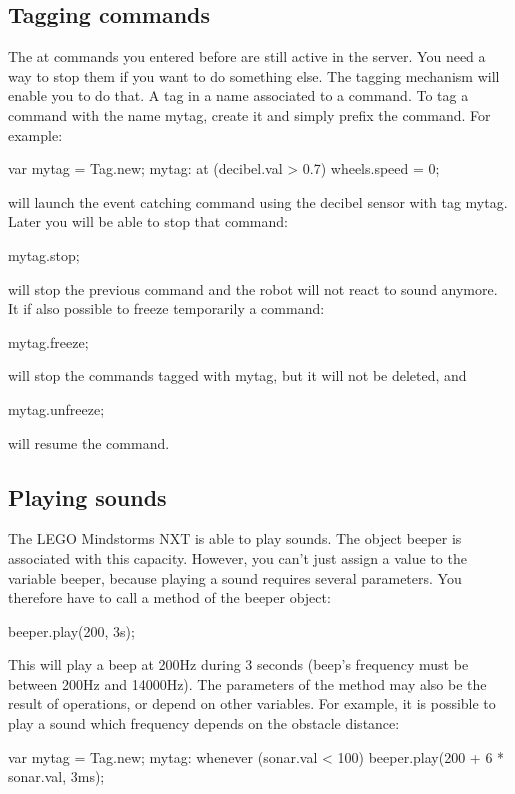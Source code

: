 \subsection{Tagging commands}
The at commands you entered before are still active in the server. You need a
way to stop them if you want to do something else. The tagging mechanism will
enable you to do that.
A tag in a name associated to a command. To tag a command with the name mytag,
create it and simply prefix the command. For example:
\begin{urbiunchecked}
var mytag = Tag.new;
mytag: at (decibel.val > 0.7)
  wheels.speed = 0;
\end{urbiunchecked}

will launch the event catching command using the decibel sensor with tag mytag.
Later you will be able to stop that command:
\begin{urbiunchecked}
mytag.stop;
\end{urbiunchecked}

will stop the previous command and the robot will not react to sound anymore.
It if also possible to freeze temporarily a command:
\begin{urbiunchecked}
mytag.freeze;
\end{urbiunchecked}

will stop the commands tagged with mytag, but it will not be deleted, and
\begin{urbiunchecked}
mytag.unfreeze;
\end{urbiunchecked}

will resume the command.

\subsection{Playing sounds}
\label{sec:nxt:sounds}
The LEGO Mindstorms NXT is able to play sounds. The object beeper is associated
with this capacity. However, you can't just assign a value to the variable
beeper, because playing a sound requires several parameters. You therefore have
to call a method of the beeper object:
\begin{urbiunchecked}
beeper.play(200, 3s);
\end{urbiunchecked}

This will play a beep at 200Hz during 3 seconds (beep's frequency must be
between 200Hz and 14000Hz).
The parameters of the method may also be the result of operations, or depend on
other variables. For example, it is possible to play a sound which frequency
depends on the obstacle distance:
\begin{urbiunchecked}
var mytag = Tag.new;
mytag: whenever (sonar.val < 100)
  beeper.play(200 + 6 * sonar.val, 3ms);
\end{urbiunchecked}

